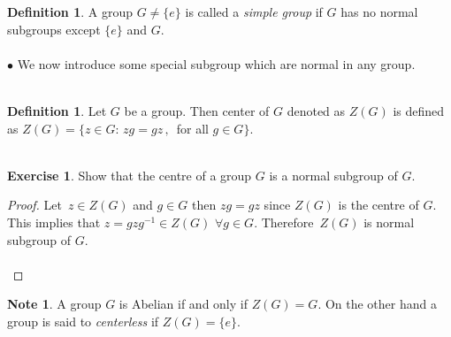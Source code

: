 \documentclass[11pt,a4paper]{article}
\theoremstyle{definition}
\newtheorem{defn}[thm]{Definition}
\newtheorem{exe}[thm]{Exercise}
\newtheorem*{note}{Note}
\begin{document}
\begin{defn}
A group $G\neq \{e\}$ is called a \textit{simple group} if $G$ has no normal subgroups except $\{e\}$ and $G$.\\\\



$\bullet$ We now introduce some special subgroup which are normal in any group.\\\\
\end{defn}



\begin{defn}
Let $G$ be a group. Then center of $G$ denoted as $Z(G)$ is defined as $Z(G) = \{z\in G:\, zg = gz\, , \, $ for all $g\in G\}$.\\\\
\end{defn}




\begin{exe}
Show that the centre of a group $G$ is a normal subgroup of $G$.\\
\end{exe}

\begin{proof}
Let $\, z\in Z(G)$ and $g\in G$ then $zg = gz$ since $Z(G)$ is the centre of $G$. This implies that $z = gzg^{-1}\in Z(G)\,\, \forall g\in G$. Therefore\, $Z(G)$ is normal subgroup of $G$.\\\\
\end{proof}



\begin{note}
A group $G$ is Abelian if and only if $Z(G) = G$. On the other hand a group is said to \textit{centerless} if $Z(G) = \{e\}$.\\\\
\end{note}
\end{document}
